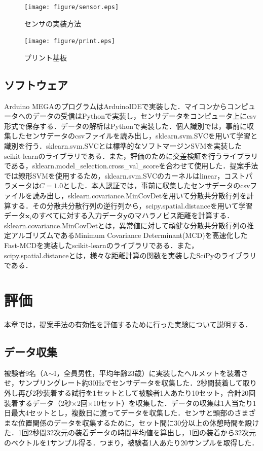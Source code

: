 \documentclass[Japanese,noauthor]{dicomopapers}
\begin{document}
\begin{figure}[!t]
  \begin{center}
    \texttt{[image: figure/sensor.eps]}
  \end{center}
  \caption{センサの実装方法}
  \label{sensor}
\end{figure}

\begin{figure}[!t]
  \begin{center}
    \texttt{[image: figure/print.eps]}
  \end{center}
  \caption{プリント基板}
  \label{print}
\end{figure}

\subsection{ソフトウェア}
Arduino MEGAのプログラムはArduinoIDEで実装した．マイコンからコンピュータへのデータの受信はPythonで実装し，センサデータをコンピュータ上にcsv形式で保存する．データの解析はPythonで実装した．個人識別では，事前に収集したセンサデータのcsvファイルを読み出し，sklearn.svm.SVCを用いて学習と識別を行う．sklearn.svm.SVCとは標準的なソフトマージンSVMを実装したscikit-learnのライブラリである．また，評価のために交差検証を行うライブラリである，sklearn.model\_selection.cross\_val\_scoreを合わせて使用した．提案手法では線形SVMを使用するため，sklearn.svm.SVCのカーネルはlinear，コストパラメータは$C=1.0$とした．本人認証では，事前に収集したセンサデータのcsvファイルを読み出し，sklearn.covariance.MinCovDetを用いて分散共分散行列を計算する．その分散共分散行列の逆行列から，scipy.spatial.distanceを用いて学習データ$\bm{x}_i$のすべてに対する入力データ$\bm{y}$のマハラノビス距離を計算する．sklearn.covariance.MinCovDetとは，異常値に対して頑健な分散共分散行列の推定アルゴリズムであるMinimum Covariance Determinant(MCD)を高速化したFast-MCD\cite{fast_mcd}を実装したscikit-learnのライブラリである．また，scipy.spatial.distanceとは，様々な距離計算の関数を実装したSciPyのライブラリである．

\section{評価}
\label{evaluation}
本章では，提案手法の有効性を評価するために行った実験について説明する．

\subsection{データ収集}
被験者9名（A$\sim$I，全員男性，平均年齢23歳）に実装したヘルメットを装着させ，サンプリングレート約30Hzでセンサデータを収集した．2秒間装着して取り外し再び2秒装着する試行を1セットとして被験者1人あたり10セット，合計20回装着するデータ（2秒$\times$2回$\times$10セット）を収集した．データの収集は1人当たり1日最大4セットとし，複数日に渡ってデータを収集した．センサと頭部のさまざまな位置関係のデータを収集するために，セット間に30分以上の休憩時間を設けた．1回2秒間32次元の装着データの時間平均値を算出し，1回の装着から32次元のベクトルを1サンプル得る．つまり，被験者1人あたり20サンプルを取得した．
\end{document}
